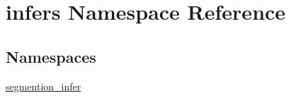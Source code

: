 \hypertarget{namespaceinfers}{}\section{infers Namespace Reference}
\label{namespaceinfers}
\subsection*{Namespaces}
\begin{DoxyCompactItemize}
\item 
 \mbox{\hyperlink{namespaceinfers_1_1segmention__infer}{segmention\+\_\+infer}}
\end{DoxyCompactItemize}
